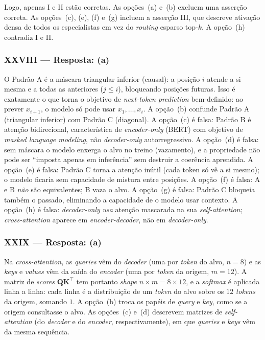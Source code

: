 \documentclass{dlproblemset}
\begin{document}
Logo, apenas I e II estão corretas. As opções~(a) e~(b) excluem uma asserção correta.
As opções~(c), (e), (f) e~(g) incluem a asserção III, que descreve ativação densa de
todos os especialistas em vez do \textit{routing} esparso top-$k$. A opção~(h)
contradiz I e II.

\subsubsection*{XXVIII — Resposta: (a)}
O Padrão A é a máscara triangular inferior (causal): a posição $i$ atende a si mesma e
a todas as anteriores ($j \le i$), bloqueando posições futuras. Isso é exatamente o que
torna o objetivo de \textit{next-token prediction} bem-definido: ao prever $x_{i+1}$,
o modelo só pode usar $x_1, \ldots, x_i$.
A opção~(b) confunde Padrão A (triangular inferior) com Padrão C (diagonal). A
opção~(c) é falsa: Padrão B é atenção bidirecional, característica de
\textit{encoder-only} (BERT) com objetivo de \textit{masked language modeling}, não
\textit{decoder-only} autorregressivo. A opção~(d) é falsa: sem máscara o modelo
enxerga o alvo no treino (vazamento), e a propriedade não pode ser ``imposta apenas em
inferência'' sem destruir a coerência aprendida. A opção~(e) é falsa: Padrão C torna a
atenção inútil (cada token só vê a si mesmo); o modelo ficaria sem capacidade de
mistura entre posições. A opção~(f) é falsa: A e B \emph{não} são equivalentes; B vaza
o alvo. A opção~(g) é falsa: Padrão C bloqueia também o passado, eliminando a
capacidade de o modelo usar contexto. A opção~(h) é falsa: \textit{decoder-only}
\emph{usa} atenção mascarada na sua \textit{self-attention}; \textit{cross-attention}
aparece em \textit{encoder-decoder}, não em \textit{decoder-only}.

\subsubsection*{XXIX — Resposta: (a)}
Na \textit{cross-attention}, as \textit{queries} vêm do \textit{decoder} (uma por
\textit{token} do alvo, $n = 8$) e as \textit{keys} e \textit{values} vêm da saída do
\textit{encoder} (uma por \textit{token} da origem, $m = 12$). A matriz de
\textit{scores} $\mathbf{Q}\mathbf{K}^\top$ tem portanto \textit{shape} $n \times m =
8 \times 12$, e a \textit{softmax} é aplicada linha a linha: cada linha é a distribuição
de um \textit{token} do alvo sobre os $12$ \textit{tokens} da origem, somando $1$.
A opção~(b) troca os papéis de \textit{query} e \textit{key}, como se a origem
consultasse o alvo. As opções~(c) e~(d) descrevem matrizes de \textit{self-attention}
(do \textit{decoder} e do \textit{encoder}, respectivamente), em que \textit{queries} e
\textit{keys} vêm da mesma sequência.
\end{document}
